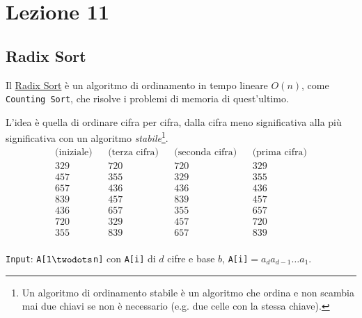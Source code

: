 \section{Lezione 11}

\subsection{Radix Sort}
Il \href{https://en.wikipedia.org/wiki/Radix_sort}{Radix Sort} è un algoritmo di ordinamento in tempo
lineare $O(n)$, come \texttt{Counting Sort}, che risolve i problemi di memoria di quest'ultimo.

L'idea è quella di ordinare cifra per cifra, dalla cifra meno significativa alla più significativa con un 
algoritmo \emph{stabile}\footnote{Un algoritmo di ordinamento stabile è un algoritmo che ordina e
non scambia mai due chiavi se non è necessario (e.g. due celle con la stessa chiave).}.
\begin{align*}
	\text{(iniziale)} && \text{(terza cifra)} && \text{(seconda cifra)} && \text{(prima cifra)} \\
	329 && 720 && 720 && 329 \\
	457 && 355 && 329 && 355 \\
	657 && 436 && 436 && 436 \\
	839 && 457 && 839 && 457 \\
	436 && 657 && 355 && 657 \\
	720 && 329 && 457 && 720 \\
	355 && 839 && 657 && 839 \\
\end{align*}

\texttt{Input}: \texttt{A[1$\twodots$n]} con \texttt{A[i]} di $d$ cifre e base $b$,
\texttt{A[i]}$= a_d a_{d-1}\dots a_1$.



